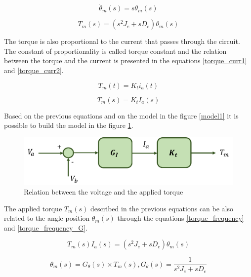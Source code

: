 \begin{equation}\label{theta_relation}
\dot{\theta}_{m}(s)= s\theta_{m}(s)
\end{equation}

\begin{equation}\label{torque_frequency_theta}
T_{m}(s)= (s^{2}J_{e} + sD_{e})\theta_{m}(s)
\end{equation}

The torque is also proportional to the current that passes through the circuit. The constant of proportionality is called torque constant and the relation between the torque and the current is presented in the equations \ref{torque_curr1} and \ref{torque_curr2}.

\begin{equation}\label{torque_curr1}
T_{m}(t)= K_{t} i_{a}(t)
\end{equation}

\begin{equation}\label{torque_curr2}
T_{m}(s)= K_{t} I_{a}(s)
\end{equation}

Based on the previous equations and on the model in the figure \ref{model1} it is possible to build the model in the figure \ref{model2}.

\begin{figure}[H]
\centering
\includegraphics[scale=0.6]{figures/model2.png}
\caption{Relation between the voltage and the applied torque}
\label{model2}
\end{figure}

The applied torque $T_{m}(s)$ described in the previous equations can be also related to the angle position $\theta_{m}(s)$ through the equations \ref{torque_frequency} and \ref{torque_frequency_G}.

\begin{equation}\label{torque_frequency}
T_{m}(s) I_{a}(s)= (s^{2}J_{e} + sD_{e})\theta_{m}(s)
\end{equation}

\begin{equation}\label{torque_frequency_G}
\theta_{m}(s)= G_{\theta}(s)\times T_{m}(s) , G_{\theta}(s)=\frac{1}{s^{2}J_{e} + sD_{e}}
\end{equation}

